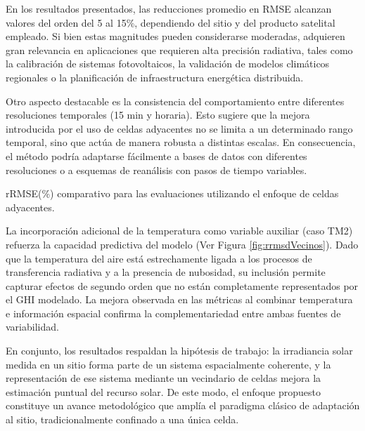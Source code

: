 \documentclass[letterpaper,12pt, twoside]{report}
\providecommand{\DIFdeltex}[1]{{\protect\color{red} \scriptsize #1}} %
\providecommand{\DIFdelFL}[1]{\DIFdel{#1}} %
\providecommand{\DIFdel}[1]{\texorpdfstring{\DIFdeltex{#1}}{}} %
\begin{document}
\DIFdel{En los resultados presentados, las reducciones promedio en RMSE alcanzan valores del orden del 5 al 15\%, dependiendo del sitio y del producto satelital empleado. Si bien estas magnitudes pueden considerarse moderadas, adquieren gran relevancia en aplicaciones que requieren alta precisión radiativa, tales como la calibración de sistemas fotovoltaicos, la validación de modelos climáticos regionales o la planificación de infraestructura energética distribuida.
}%

\DIFdel{Otro aspecto destacable es la consistencia del comportamiento entre diferentes resoluciones temporales (15 min y horaria). Esto sugiere que la mejora introducida por el uso de celdas adyacentes no se limita a un determinado rango temporal, sino que actúa de manera robusta a distintas escalas. En consecuencia, el método podría adaptarse fácilmente a bases de datos con diferentes resoluciones o a esquemas de reanálisis con pasos de tiempo variables.
}%

{%
\DIFdelFL{rRMSE(\%) comparativo para las evaluaciones utilizando el enfoque de celdas adyacentes.}}

\DIFdel{La incorporación adicional de la temperatura como variable auxiliar (caso TM2) refuerza la capacidad predictiva del modelo (Ver Figura \ref{fig:rrmsdVecinos}). Dado que la temperatura del aire está estrechamente ligada a los procesos de transferencia radiativa y a la presencia de nubosidad, su inclusión permite capturar efectos de segundo orden que no están completamente representados por el GHI modelado. La mejora observada en las métricas al combinar temperatura e información espacial confirma la complementariedad entre ambas fuentes de variabilidad.
}%

\DIFdel{En conjunto, los resultados respaldan la hipótesis de trabajo: la irradiancia solar medida en un sitio forma parte de un sistema espacialmente coherente, y la representación de ese sistema mediante un vecindario de celdas mejora la estimación puntual del recurso solar. De este modo, el enfoque propuesto constituye un avance metodológico que amplía el paradigma clásico de adaptación al sitio, tradicionalmente confinado a una única celda.
}%
\end{document}
